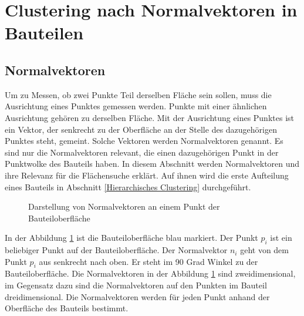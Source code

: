 \section{Clustering nach Normalvektoren in Bauteilen}
\label{Clustering nach Normalvektoren in Bauteilen}

\subsection{Normalvektoren}
\label{Normalvektoren}

Um zu Messen, ob zwei Punkte Teil derselben Fläche sein sollen, muss die Ausrichtung eines Punktes gemessen werden. Punkte mit einer ähnlichen Ausrichtung gehören zu derselben Fläche. Mit der Ausrichtung eines Punktes ist ein Vektor, 
der senkrecht zu der Oberfläche an der Stelle des dazugehörigen Punktes steht, gemeint. Solche Vektoren werden Normalvektoren genannt. Es sind nur die Normalvektoren relevant, 
die einen dazugehörigen Punkt in der Punktwolke des Bauteils haben. In diesem Abschnitt werden Normalvektoren und ihre Relevanz für die Flächensuche erklärt. Auf ihnen wird die erste Aufteilung eines Bauteils in Abschnitt \ref{Hierarchisches Clustering} durchgeführt.

    \begin{figure}[t]
        \centering
        \caption[Darstellung von Normalvektoren an einem Punkt der Bauteiloberfläche]{Darstellung von Normalvektoren an einem Punkt der Bauteiloberfläche}
            \label{Darstellung von Normalvektoren an einem Punkt der Bauteiloberfläche}
    \end{figure}

In der Abbildung \ref{Darstellung von Normalvektoren an einem Punkt der Bauteiloberfläche} ist die Bauteiloberfläche blau markiert. Der Punkt $p_i$ ist ein beliebiger Punkt auf der Bauteiloberfläche. Der Normalvektor $n_i$ geht von dem Punkt $p_i$ aus senkrecht nach oben.
Er steht im 90 Grad Winkel zu der Bauteiloberfläche. Die Normalvektoren in der Abbildung \ref{Darstellung von Normalvektoren an einem Punkt der Bauteiloberfläche} sind zweidimensional, im Gegensatz dazu sind die Normalvektoren auf den Punkten im Bauteil dreidimensional.
Die Normalvektoren werden für jeden Punkt anhand der Oberfläche des Bauteils bestimmt. 

